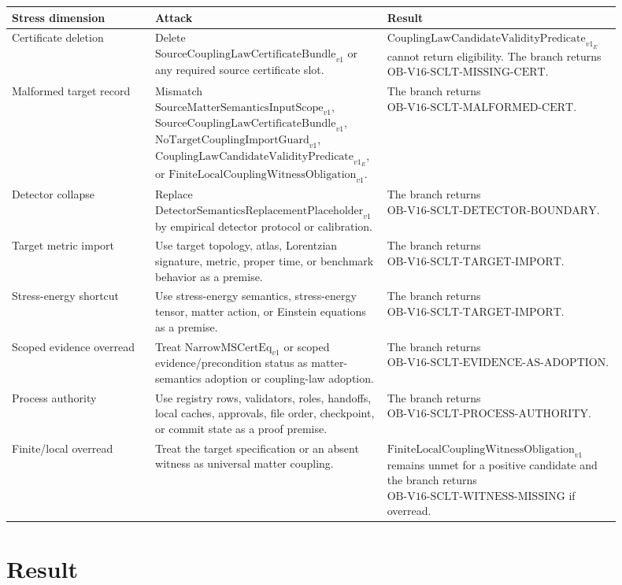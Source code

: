 \documentclass[11pt]{article}
\newcommand{\SCLBundle}{\mathrm{SourceCouplingLawCertificateBundle}_{v1}}
\newcommand{\SMScope}{\mathrm{SourceMatterSemanticsInputScope}_{v1}}
\newcommand{\DetPlaceholder}{\mathrm{DetectorSemanticsReplacementPlaceholder}_{v1}}
\newcommand{\NTGuard}{\mathrm{NoTargetCouplingImportGuard}_{v1}}
\newcommand{\Validity}{\mathrm{CouplingLawCandidateValidityPredicate}_{v1}}
\newcommand{\WitnessOb}{\mathrm{FiniteLocalCouplingWitnessObligation}_{v1}}
\begin{document}
\begin{longtable}{p{0.23\linewidth}p{0.34\linewidth}p{0.33\linewidth}}
\toprule
Stress dimension & Attack & Result \\
\midrule
Certificate deletion & Delete \(\SCLBundle\) or any required source
certificate slot. & \(\Validity_E\) cannot return eligibility. The branch
returns \(\mathrm{OB\text{-}V16\text{-}SCLT\text{-}MISSING\text{-}CERT}\). \\
Malformed target record & Mismatch \(\SMScope\), \(\SCLBundle\),
\(\NTGuard\), \(\Validity_E\), or \(\WitnessOb\). & The branch returns
\(\mathrm{OB\text{-}V16\text{-}SCLT\text{-}MALFORMED\text{-}CERT}\). \\
Detector collapse & Replace \(\DetPlaceholder\) by empirical detector
protocol or calibration. & The branch returns
\(\mathrm{OB\text{-}V16\text{-}SCLT\text{-}DETECTOR\text{-}BOUNDARY}\). \\
Target metric import & Use target topology, atlas, Lorentzian signature,
metric, proper time, or benchmark behavior as a premise. & The branch returns
\(\mathrm{OB\text{-}V16\text{-}SCLT\text{-}TARGET\text{-}IMPORT}\). \\
Stress-energy shortcut & Use stress-energy semantics, stress-energy tensor,
matter action, or Einstein equations as a premise. & The branch returns
\(\mathrm{OB\text{-}V16\text{-}SCLT\text{-}TARGET\text{-}IMPORT}\). \\
Scoped evidence overread & Treat \(\mathrm{NarrowMSCertEq}_{v1}\) or scoped
evidence/precondition status as matter-semantics adoption or coupling-law
adoption. & The branch returns
\(\mathrm{OB\text{-}V16\text{-}SCLT\text{-}EVIDENCE\text{-}AS\text{-}ADOPTION}\). \\
Process authority & Use registry rows, validators, roles, handoffs, local
caches, approvals, file order, checkpoint, or commit state as a proof premise.
& The branch returns
\(\mathrm{OB\text{-}V16\text{-}SCLT\text{-}PROCESS\text{-}AUTHORITY}\). \\
Finite/local overread & Treat the target specification or an absent witness
as universal matter coupling. & \(\WitnessOb\) remains unmet for a positive
candidate and the branch returns
\(\mathrm{OB\text{-}V16\text{-}SCLT\text{-}WITNESS\text{-}MISSING}\) if
overread. \\
\bottomrule
\end{longtable}

\section{Result}
\end{document}
